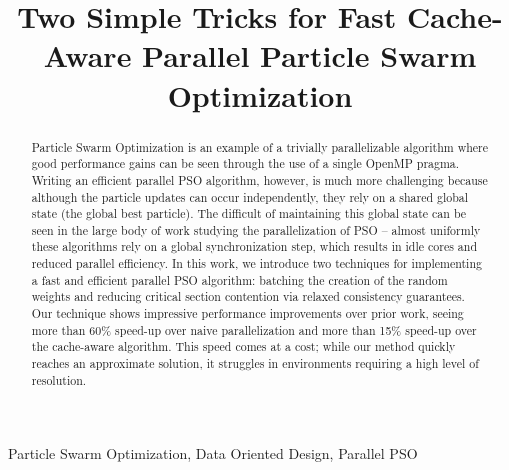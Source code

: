 \documentclass[conference]{IEEEtran}
\begin{document}
\title{Two Simple Tricks for Fast Cache-Aware Parallel Particle Swarm Optimization}

\author{
\and
{}
}

\maketitle

\begin{abstract}
Particle Swarm Optimization is an example of a trivially parallelizable
algorithm where good performance gains can be seen through the use of a single
OpenMP pragma. Writing an efficient parallel PSO algorithm, however, is much more
challenging because although the particle updates can occur independently, they
rely on a shared global state (the global best particle). The difficult of
maintaining this global state can be seen in the large body of work studying the
parallelization of PSO -- almost uniformly these algorithms rely on a global
synchronization step, which results in idle cores and reduced parallel
efficiency. In this work, we introduce two techniques for implementing a fast and
efficient parallel PSO algorithm: batching the creation of the random weights
and reducing critical section contention via relaxed consistency guarantees.
Our technique shows impressive performance improvements over prior work, seeing
more than 60\% speed-up over naive parallelization and more than 15\% speed-up
over the cache-aware algorithm. This speed comes at a cost; while our method
quickly reaches an approximate solution, it struggles in environments requiring
a high level of resolution.
\end{abstract}

\begin{IEEEkeywords}
Particle Swarm Optimization, Data Oriented Design, Parallel PSO
\end{IEEEkeywords}





\end{document}

